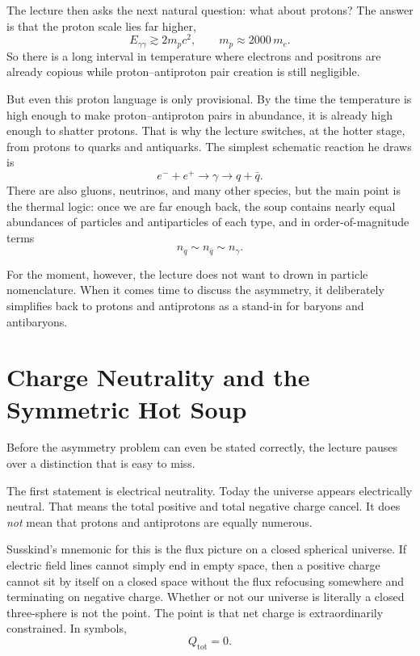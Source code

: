 The lecture then asks the next natural question: what about protons? The answer is that the proton scale lies far higher,
\begin{equation}
E_{\gamma\gamma} \gtrsim 2m_p c^2,
\qquad
m_p \approx 2000\,m_e.
\end{equation}
So there is a long interval in temperature where electrons and positrons are already copious while proton--antiproton pair creation is still negligible.

But even this proton language is only provisional. By the time the temperature is high enough to make proton--antiproton pairs in abundance, it is already high enough to shatter protons. That is why the lecture switches, at the hotter stage, from protons to quarks and antiquarks. The simplest schematic reaction he draws is
\begin{equation}
e^- + e^+ \to \gamma \to q + \bar q.
\end{equation}
There are also gluons, neutrinos, and many other species, but the main point is the thermal logic: once we are far enough back, the soup contains nearly equal abundances of particles and antiparticles of each type, and in order-of-magnitude terms
\begin{equation}
n_q \sim n_{\bar q} \sim n_\gamma.
\end{equation}

For the moment, however, the lecture does not want to drown in particle nomenclature. When it comes time to discuss the asymmetry, it deliberately simplifies back to protons and antiprotons as a stand-in for baryons and antibaryons.

\section{Charge Neutrality and the Symmetric Hot Soup}

Before the asymmetry problem can even be stated correctly, the lecture pauses over a distinction that is easy to miss.

The first statement is electrical neutrality. Today the universe appears electrically neutral. That means the total positive and total negative charge cancel. It does \emph{not} mean that protons and antiprotons are equally numerous.

Susskind's mnemonic for this is the flux picture on a closed spherical universe. If electric field lines cannot simply end in empty space, then a positive charge cannot sit by itself on a closed space without the flux refocusing somewhere and terminating on negative charge. Whether or not our universe is literally a closed three-sphere is not the point. The point is that net charge is extraordinarily constrained. In symbols,
\begin{equation}
Q_{\mathrm{tot}}=0.
\end{equation}

